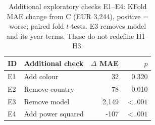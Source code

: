 \begin{table}[h!]
\centering\small\setlength{\tabcolsep}{3pt}
\begin{tabular}{llrr}
\toprule
ID & Additional check & $\Delta$ MAE & $p$\\
\midrule
E1 & Add colour & 32 & 0.320\\
E2 & Remove country & 78 & 0.010\\
E3 & Remove model & 2,149 & $<.001$\\
E4 & Add power squared & -107 & $<.001$\\
\bottomrule
\end{tabular}
\caption{Additional exploratory checks E1--E4: KFold MAE change from C (EUR 3,244), positive = worse; paired fold $t$-tests. E3 removes model and its year terms. These do not redefine H1--H3.}
\label{tab:extra}
\end{table}
